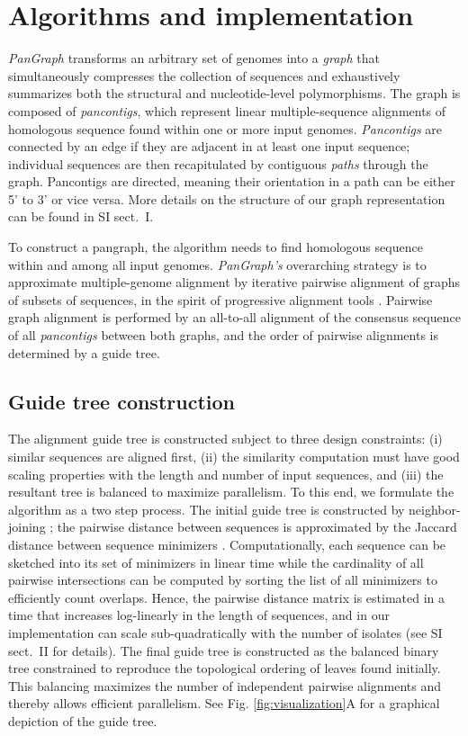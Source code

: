 \documentclass[aps,rmp,preprint,superscriptaddress,10pt,linenumbers]{revtex4-1}
\newcommand{\SIgraph}{I}
\newcommand{\SIalgo}{II}
\begin{document}
\section{Algorithms and implementation}
\emph{PanGraph} transforms an arbitrary set of genomes into a \emph{graph} that simultaneously compresses the collection of sequences and exhaustively summarizes both the structural and nucleotide-level polymorphisms.
The graph is composed of \emph{pancontigs}, which represent linear multiple-sequence alignments of homologous sequence found within one or more input genomes.
\emph{Pancontigs} are connected by an edge if they are adjacent in at least one input sequence; individual sequences are then recapitulated by contiguous \emph{paths} through the graph.
Pancontigs are directed, meaning their orientation in a path can be either 5' to 3' or vice versa.
More details on the structure of our graph representation can be found in SI sect.~\SIgraph{}.

To construct a pangraph, the algorithm needs to find homologous sequence within and among all input genomes.
\emph{PanGraph's} overarching strategy is to approximate multiple-genome alignment by iterative pairwise alignment of graphs of subsets of sequences, in the spirit of progressive alignment tools \cite{feng1987progressive,darling2010progressivemauve,armstrong2020progressive}.
Pairwise graph alignment is performed by an all-to-all alignment of the consensus sequence of all \emph{pancontigs} between both graphs, and the order of pairwise alignments is determined by a guide tree.

\subsection{Guide tree construction}
The alignment guide tree is constructed subject to three design constraints: (i) similar sequences are aligned first, (ii) the similarity computation must have good scaling properties with the length and number of input sequences, and (iii) the resultant tree is balanced to maximize parallelism.
To this end, we formulate the algorithm as a two step process.
The initial guide tree is constructed by neighbor-joining \cite{saitou1987neighbor}; the pairwise distance between sequences is approximated by the Jaccard distance between sequence minimizers \cite{roberts2004reducing}.
Computationally, each sequence can be sketched into its set of minimizers in linear time while the cardinality of all pairwise intersections can be computed by sorting the list of all minimizers to efficiently count overlaps.
Hence, the pairwise distance matrix is estimated in a time that increases log-linearly in the length of sequences, and in our implementation can scale sub-quadratically with the number of isolates (see SI sect.~\SIalgo{} for details).
The final guide tree is constructed as the balanced binary tree constrained to reproduce the topological ordering of leaves found initially.
This balancing maximizes the number of independent pairwise alignments and thereby allows efficient parallelism.
See Fig. \ref{fig:visualization}A for a graphical depiction of the guide tree.
\end{document}
